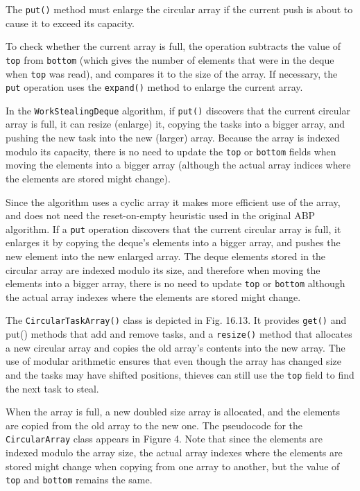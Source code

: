 The \lstinline!put()! method must enlarge the circular array if the
current push is about to cause it to exceed its capacity.

To check whether the current array is full, the operation subtracts
the value of \lstinline!top! from \lstinline!bottom! (which gives the
number of elements that were in the deque when \lstinline!top! was
read), and compares it to the size of the array. If necessary, the
\lstinline!put! operation uses the \lstinline!expand()! method to
enlarge the current array.



In the \lstinline!WorkStealingDeque! algorithm, if \lstinline!put()!
discovers that the current circular array is full, it can resize
(enlarge) it, copying the tasks into a bigger array, and pushing the
new task into the new (larger) array. Because the array is indexed
modulo its capacity, there is no need to update the \lstinline!top! or
\lstinline!bottom! fields when moving the elements into a bigger array
(although the actual array indices where the elements are stored might
change).

Since the algorithm uses a cyclic array it makes more efficient use of
the array, and does not need the reset-on-empty heuristic used in the
original ABP algorithm. If a \lstinline!put! operation discovers that
the current circular array is full, it enlarges it by copying the
deque's elements into a bigger array, and pushes the new element into
the new enlarged array. The deque elements stored in the circular
array are indexed modulo its size, and therefore when moving the
elements into a bigger array, there is no need to update
\lstinline!top! or \lstinline!bottom! although the actual array
indexes where the elements are stored might change.

The \lstinline!CircularTaskArray()! class is depicted in
Fig. 16.13. It provides \lstinline!get()! and put() methods that add
and remove tasks, and a \lstinline!resize()! method that allocates a
new circular array and copies the old array's contents into the new
array. The use of modular arithmetic ensures that even though the
array has changed size and the tasks may have shifted positions,
thieves can still use the \lstinline!top! field to find the next task
to steal.

When the array is full, a new doubled size array is allocated, and the
elements are copied from the old array to the new one. The pseudocode
for the \lstinline!CircularArray! class appears in Figure 4. Note that
since the elements are indexed modulo the array size, the actual array
indexes where the elements are stored might change when copying from
one array to another, but the value of \lstinline!top!  and
\lstinline!bottom! remains the same.

